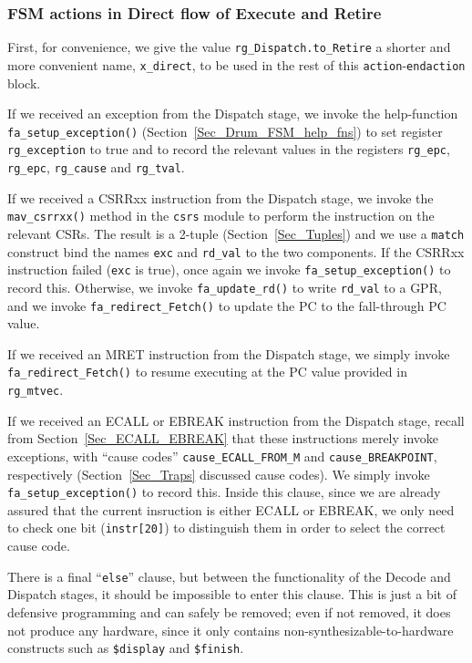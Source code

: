 
\subsubsection{FSM actions in Direct flow of Execute and Retire}


First, for convenience, we give the value \verb|rg_Dispatch.to_Retire|
a shorter and more convenient name, \verb|x_direct|, to be used in the
rest of this \verb|action|-\verb|endaction| block.

If we received an exception from the Dispatch stage, we invoke the
help-function \verb|fa_setup_exception()|
(Section~\ref{Sec_Drum_FSM_help_fns}) to set register
\verb|rg_exception| to true and to record the relevant values in the
registers \verb|rg_epc|, \verb|rg_epc|, \verb|rg_cause| and
\verb|rg_tval|.

If we received a CSRRxx instruction from the Dispatch stage, we invoke
the \verb|mav_csrrxx()| method in the \verb|csrs| module to perform
the instruction on the relevant CSRs.  The result is a 2-tuple
(Section~\ref{Sec_Tuples}) and we use a \verb|match| construct bind
the names \verb|exc| and \verb|rd_val| to the two components.  If the
CSRRxx instruction failed (\verb|exc| is true), once again we invoke
\verb|fa_setup_exception()| to record this.  Otherwise, we invoke
\verb|fa_update_rd()| to write \verb|rd_val| to a GPR, and we invoke
\verb|fa_redirect_Fetch()| to update the PC to the fall-through PC
value.

If we received an MRET instruction from the Dispatch stage, we simply
invoke \verb|fa_redirect_Fetch()| to resume executing at the PC value
provided in \verb|rg_mtvec|.

If we received an ECALL or EBREAK instruction from the Dispatch stage,
recall from Section~\ref{Sec_ECALL_EBREAK} that these instructions
merely invoke exceptions, with ``cause codes''
\verb|cause_ECALL_FROM_M| and \verb|cause_BREAKPOINT|, respectively
(Section~\ref{Sec_Traps} discussed cause codes).  We simply invoke
\verb|fa_setup_exception()| to record this.  Inside this clause, since
we are already assured that the current insruction is either ECALL or
EBREAK, we only need to check one bit (\verb|instr[20]|) to
distinguish them in order to select the correct cause code.

There is a final ``\verb|else|'' clause, but between the functionality
of the Decode and Dispatch stages, it should be impossible to enter
this clause.  This is just a bit of defensive programming and can
safely be removed; even if not removed, it does not produce any
hardware, since it only contains non-synthesizable-to-hardware
constructs such as \verb|$display| and \verb|$finish|.

